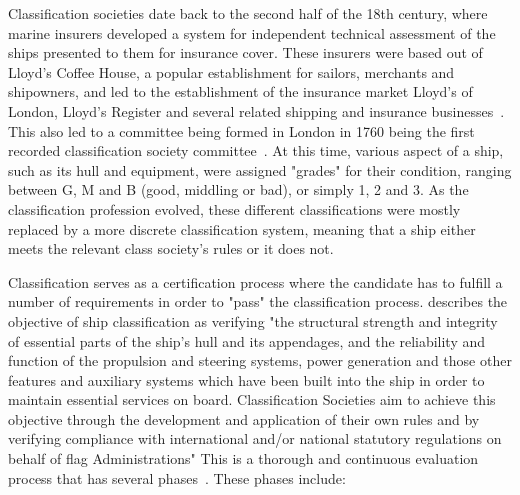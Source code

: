 Classification societies date back to the second half of the 18th century, where marine insurers developed a system for independent technical assessment of the ships
presented to them for insurance cover. These insurers were based out of Lloyd's Coffee House, a popular establishment for sailors, merchants and shipowners, and led to
the establishment of the insurance market Lloyd's of London, Lloyd's Register and several related shipping and insurance businesses~\citep{Marcus1975}.
This also led to a committee being formed in London in 1760 being the first recorded classification society committee~\citep{Hormann2006}. 
At this time, various aspect of a ship, such as its hull and equipment, were assigned "grades" for their condition, ranging between G, M and B (good, middling or bad), 
or simply 1, 2 and 3. As the classification profession evolved, these different classifications were mostly replaced by a more discrete classification system, meaning
that a ship either meets the relevant class society's rules or it does not. 

Classification serves as a certification process where the candidate 
has to fulfill a number of requirements in order to "pass" the classification process. 
\citet{Hormann2006} describes the objective of ship classification as verifying "the structural strength and integrity of essential parts of the ship’s hull 
and its appendages, and the reliability and function of the propulsion and steering systems, power generation and those other features and auxiliary systems 
which have been built into the ship in order to maintain essential services on board. Classification Societies aim to achieve this objective through the development 
and application of their own rules and by verifying compliance with international and/or national statutory regulations on behalf of flag Administrations"
This is a thorough and continuous evaluation process that has several phases~\citep{Hormann2006}. These phases include:

